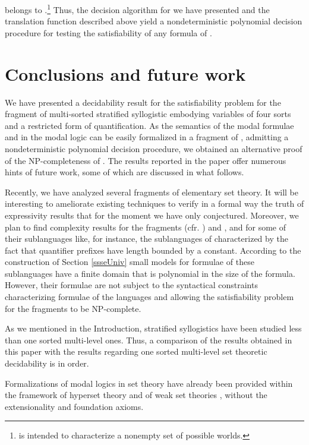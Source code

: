\documentclass{fundam}
\begin{document}
belongs to .\footnote{ is intended to
characterize a nonempty set of possible worlds.} Thus, the decision
algorithm for  we have presented and the translation function
described above yield a nondeterministic polynomial decision procedure
for testing the satisfiability of any formula  of .


\section{Conclusions and future work}
We have presented a decidability result for the satisfiability problem
for the fragment  of multi-sorted stratified syllogistic
embodying variables of four sorts and a restricted form of
quantification.  As the semantics of the modal formulae  and  in the modal logic 
can be easily formalized in a fragment of , admitting a
nondeterministic polynomial decision procedure, we obtained an
alternative proof of the \textsf{NP}-completeness of . The results
reported in the paper offer numerous hints of future work, some of which are discussed in what follows.

 Recently, we have analyzed several fragments of elementary set theory. It
will be interesting to ameliorate existing techniques to verify in a formal way the truth
of expressivity results that for the moment we have only conjectured. Moreover, we plan to
find complexity results for the fragments  (cfr. \cite{CanNic08}) and , and for some of their sublanguages
like, for instance, the sublanguages of  characterized by the fact that quantifier prefixes have
length bounded by a constant. According to the construction of Section \ref{ssseUniv} small models for
formulae of these sublanguages have a finite domain  that is polynomial in the size of the formula. However, their
formulae are not subject to the syntactical constraints characterizing formulae of the  languages and allowing
the satisfiability problem for the  fragments to be \textsf{NP}-complete.

As we mentioned in the Introduction, stratified syllogistics have been studied less than one sorted multi-level ones.
Thus, a comparison of the results obtained in this paper with the results regarding one sorted multi-level
set theoretic decidability is in order.

Formalizations of modal logics in set theory have already been
provided within the framework of hyperset theory \cite{BaMo96} and of
weak set theories \cite{DMP95}, without the extensionality and
foundation axioms.
\end{document}
